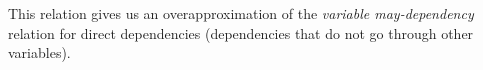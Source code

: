 This relation gives us an overapproximation of the \emph{variable may-dependency} relation for direct dependencies (dependencies that do not go through other variables).

